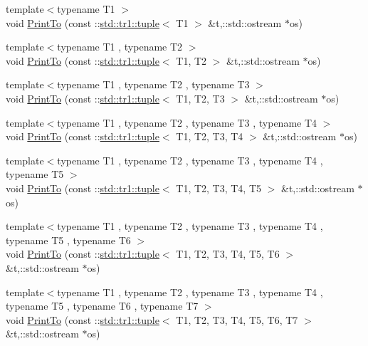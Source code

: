 \begin{DoxyCompactItemize}
\item 
{\footnotesize template$<$typename T1 $>$ }\\void \hyperlink{namespacetesting_1_1internal_ab084eab9c8c2fb4fd55cfe579fa72da2}{\-Print\-To} (const \-::\hyperlink{classstd_1_1tr1_1_1tuple}{std\-::tr1\-::tuple}$<$ \-T1 $>$ \&t,\-::std\-::ostream $\ast$os)
\item 
{\footnotesize template$<$typename T1 , typename T2 $>$ }\\void \hyperlink{namespacetesting_1_1internal_afd9f9d3d4fcf0552e0959d9d67277534}{\-Print\-To} (const \-::\hyperlink{classstd_1_1tr1_1_1tuple}{std\-::tr1\-::tuple}$<$ \-T1, \-T2 $>$ \&t,\-::std\-::ostream $\ast$os)
\item 
{\footnotesize template$<$typename T1 , typename T2 , typename T3 $>$ }\\void \hyperlink{namespacetesting_1_1internal_a7bfff6af85d2ba6b042cbd8297bee03e}{\-Print\-To} (const \-::\hyperlink{classstd_1_1tr1_1_1tuple}{std\-::tr1\-::tuple}$<$ \-T1, \-T2, \-T3 $>$ \&t,\-::std\-::ostream $\ast$os)
\item 
{\footnotesize template$<$typename T1 , typename T2 , typename T3 , typename T4 $>$ }\\void \hyperlink{namespacetesting_1_1internal_a2b8b95c16dddc5d4de96f9ef10fb4dae}{\-Print\-To} (const \-::\hyperlink{classstd_1_1tr1_1_1tuple}{std\-::tr1\-::tuple}$<$ \-T1, \-T2, \-T3, \-T4 $>$ \&t,\-::std\-::ostream $\ast$os)
\item 
{\footnotesize template$<$typename T1 , typename T2 , typename T3 , typename T4 , typename T5 $>$ }\\void \hyperlink{namespacetesting_1_1internal_adc2a693cdb33cd4d3881e4c8b16d9865}{\-Print\-To} (const \-::\hyperlink{classstd_1_1tr1_1_1tuple}{std\-::tr1\-::tuple}$<$ \-T1, \-T2, \-T3, \-T4, \-T5 $>$ \&t,\-::std\-::ostream $\ast$os)
\item 
{\footnotesize template$<$typename T1 , typename T2 , typename T3 , typename T4 , typename T5 , typename T6 $>$ }\\void \hyperlink{namespacetesting_1_1internal_a205f62732d75b884f0668eb4483b2a58}{\-Print\-To} (const \-::\hyperlink{classstd_1_1tr1_1_1tuple}{std\-::tr1\-::tuple}$<$ \-T1, \-T2, \-T3, \-T4, \-T5, \-T6 $>$ \&t,\-::std\-::ostream $\ast$os)
\item 
{\footnotesize template$<$typename T1 , typename T2 , typename T3 , typename T4 , typename T5 , typename T6 , typename T7 $>$ }\\void \hyperlink{namespacetesting_1_1internal_aa3a910677d224678f1074520bc4f625f}{\-Print\-To} (const \-::\hyperlink{classstd_1_1tr1_1_1tuple}{std\-::tr1\-::tuple}$<$ \-T1, \-T2, \-T3, \-T4, \-T5, \-T6, \-T7 $>$ \&t,\-::std\-::ostream $\ast$os)

\end{DoxyCompactItemize}
